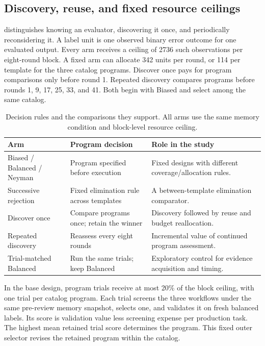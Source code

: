 \subsection{Discovery, reuse, and fixed resource ceilings}
 distinguishes knowing an evaluator, discovering it once, and periodically reconsidering it. A label unit is one observed binary error outcome for one evaluated output. Every arm receives a ceiling of 2736 such observations per eight-round block. A fixed arm can allocate 342 units per round, or 114 per template for the three catalog programs. Discover once pays for program comparisons only before round 1. Repeated discovery compares programs before rounds 1, 9, 17, 25, 33, and 41. Both begin with Biased and select among the same catalog.

\begin{table}[t]
\caption{Decision rules and the comparisons they support. All arms use the same memory condition and block-level resource ceiling.}
\label{tab:arms}\small
\begin{tabularx}{\linewidth}{@{}p{.23\linewidth}YY@{}}\toprule
Arm & Program decision & Role in the study \\\midrule
Biased / Balanced / Neyman & Program specified before execution & Fixed designs with different coverage/allocation rules. \\
Successive rejection & Fixed elimination rule across templates & A between-template elimination comparator. \\
Discover once & Compare programs once; retain the winner & Discovery followed by reuse and budget reallocation. \\
Repeated discovery & Reassess every eight rounds & Incremental value of continued program assessment. \\
Trial-matched Balanced & Run the same trials; keep Balanced & Exploratory control for evidence acquisition and timing. \\\bottomrule
\end{tabularx}
\end{table}

In the base design, program trials receive at most 20\% of the block ceiling, with one trial per catalog program. Each trial screens the three workflows under the same pre-review memory snapshot, selects one, and validates it on fresh balanced labels. Its score is validation value less screening expense per production task. The highest mean retained trial score determines the program. This fixed outer selector revises the retained program within the catalog.

